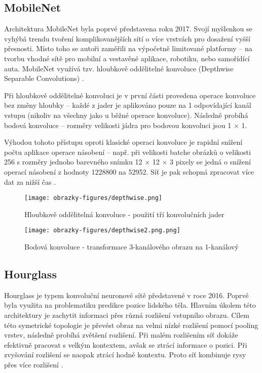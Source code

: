 \subsection*{MobileNet}
Architektura MobileNet byla poprvé představena roku 2017. Svojí myšlenkou se vyhýbá trendu tvoření komplikovanějších sítí o více vrstvách pro dosažení vyšší přesnosti. Místo toho se autoři zaměřili na výpočetně limitované platformy -- na tvorbu vhodné sítě pro mobilní a vestavěné aplikace, robotiku, nebo samořídící auta. MobileNet využívá tzv. hloubkově oddělitelné konvoluce (Depthwise Separable Convolutions) \cite{MobileNet}.

Při hloubkově oddělitelné konvoluci je v první části provedena operace konvoluce bez změny hloubky -- každé z jader je aplikováno pouze na 1 odpovídající kanál vstupu (nikoliv na všechny jako u běžné operace konvoluce). Následně probíhá bodová konvoluce -- rozměry velikosti jádra pro bodovou konvoluci jsou 1 $\times$ 1.

Výhodou tohoto přístupu oproti klasické operaci konvoluce je rapidní snížení počtu aplikace operace násobení -- např. při velikosti batche obrázků o velikosti 256 s rozměry jednoho barevného snímku 12 $\times$ 12 $\times$ 3 pixely se jedná o snížení operací násobení z hodnoty 1228800 na 52952. Síť je pak schopná zpracovat více dat za nižší čas \cite{SeparableConvolutions}. 

\begin{figure}[!htbp]
  \begin{minipage}[b]{0.5\linewidth}
    \centering
    \texttt{[image: obrazky-figures/depthwise.png]}
    \caption{Hloubkově oddělitelná konvoluce - použití tří konvolučních jader \cite{SeparableConvolutions}}
  \end{minipage}
  \hspace{0.5cm}
  \begin{minipage}[b]{0.5\linewidth}
    \centering
    \texttt{[image: obrazky-figures/depthwise2.png.png]}
    \caption{Bodová konvoluce - transformace 3-kanálového obrazu na 1-kanálový \cite{SeparableConvolutions}}
  \end{minipage}
\end{figure}

\subsection*{Hourglass}
Hourglass je typem konvoluční neuronové sítě představené v roce 2016. Poprvé byla využita na problematiku predikce pozice lidského těla. Hlavním úkolem této architektury je zachytit informaci přes různá rozlišení vstupního obrazu. Cílem této symetrické topologie je převést obraz na velmi nízké rozlišení pomocí pooling vrstev, následně probíhá zvětšení rozlišení. Při malém rozlišením síť dokáže efektivně pracovat s velkým kontextem, avšak se ztrácí informace o pozici. Při zvyšování rozlišení se naopak ztrácí hodně kontextu. Proto síť kombinuje rysy přes více rozlišení \cite{Hourglass}.

